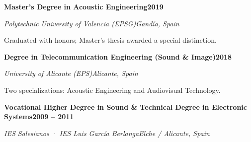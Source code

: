 \documentclass[11pt,a4paper]{article}
\newcommand{\cventry}[4]{%
  \textbf{#1}\hfill\textbf{#4}\par
  {\color{muted}\textit{#2}\hfill\textit{#3}}\par
  \vspace{2pt}
}
\begin{document}
\cventry{Master's Degree in Acoustic Engineering}{Polytechnic University of Valencia (EPSG)}{Gandía, Spain}{2019}
{\color{muted}\small Graduated with honors; Master's thesis awarded a special distinction.}\par\vspace{4pt}

\cventry{Degree in Telecommunication Engineering (Sound \& Image)}{University of Alicante (EPS)}{Alicante, Spain}{2018}
{\color{muted}\small Two specializations: Acoustic Engineering and Audiovisual Technology.}\par\vspace{4pt}

\cventry{Vocational Higher Degree in Sound \& Technical Degree in Electronic Systems}{IES Salesianos · IES Luis García Berlanga}{Elche / Alicante, Spain}{2009 – 2011}
\end{document}
